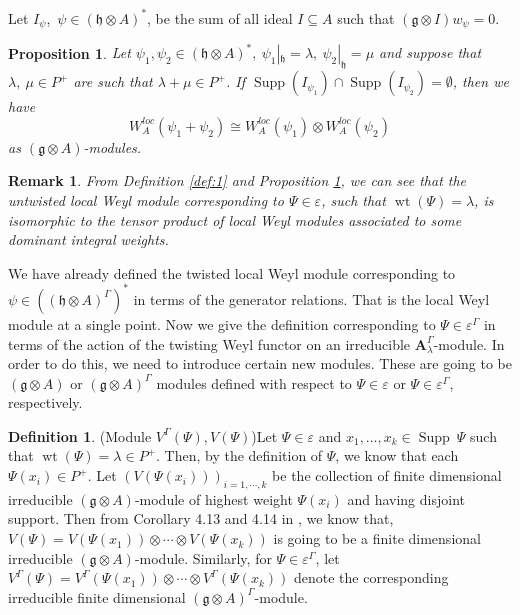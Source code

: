 \documentclass[11pt]{amsart}
\theoremstyle{plain}
\newtheorem{prop}[thm]{Proposition}
\newtheorem{rem}[thm]{Remark}
\theoremstyle{definition}
\newtheorem{defn}[thm]{Definition}
\newcommand{\g}{\mathfrak{g}}
\newcommand{\h}{\mathfrak{h}}
\newcommand{\A}{\mathbf{A}_{\lambda}^{\Gamma}}
\DeclareMathOperator{\Supp}{Supp}
\DeclareMathOperator{\wt}{wt}
\begin{document}
Let $I_{\psi}$,~$\psi\in(\h\otimes A)^{*}$, be the sum of all ideal $I\subseteq A$ such that $(\g\otimes I)w_{\psi}=0$. 
\begin{prop}\label{prop:5}
Let $\psi_{1}, \psi_{2}\in(\h\otimes A)^{*},~\psi_{1}|_{\h}=\lambda,~\psi_{2}|_{\h}=\mu$ and suppose that $\lambda,~\mu\in P^{+}$ are such that $\lambda+\mu\in P^{+}$. If $\Supp(I_{{\psi}_{1}})\cap \Supp(I_{{\psi_{2}}})=\emptyset$, then we have
    \begin{equation*}
        W_{A}^{loc}(\psi_{1}+\psi_{2})\cong W_{A}^{loc}(\psi_{1})\otimes W_{A}^{loc}(\psi_{2})
    \end{equation*}
    as $(\g\otimes A)$-modules.
\end{prop}
\begin{rem}\label{rem:2}
From Definition  \ref{def:1} and Proposition \ref{prop:5}, we can see that the untwisted local Weyl module corresponding to $\Psi\in\varepsilon$, such that $\wt(\Psi)=\lambda$, is isomorphic to the tensor product of local Weyl modules associated to some dominant integral weights.
\end{rem}
We have already defined the twisted local Weyl module corresponding to $\psi\in((\h\otimes A)^{\Gamma})^{*}$ in terms of the generator relations. That is the local Weyl module at a single point. Now we give the definition corresponding to $\Psi\in\varepsilon^{\Gamma}$ in terms of the action of the twisting Weyl functor on an irreducible $\A$-module. In order to do this, we need to introduce certain new modules. These are going to be $(\g\otimes A)$ or $(\g\otimes A)^{\Gamma}$ modules defined with respect to $\Psi\in\varepsilon$ or $\Psi\in\varepsilon^{\Gamma}$, respectively.
\begin{defn}(Module $V^{\Gamma}(\Psi),V(\Psi)$)\label{def:17}
    Let $\Psi\in\varepsilon$ and $x_{1},\ldots,x_{k}\in \Supp\ \Psi$ such that $\wt(\Psi)=\lambda\in P^{+}$. Then, by the definition of $\Psi$, we know that each $\Psi(x_{i})\in P^{+}$. Let ${ (V(\Psi(x_{i})))}_{i=1,\cdots,k}$ be the collection of finite dimensional irreducible $(\g\otimes A)$-module of highest weight $\Psi(x_{i})$ and having disjoint support. Then from Corollary 4.13 and 4.14 in \cite{Sav14}, we know that, $V(\Psi)=V(\Psi(x_{1}))\otimes\cdots\otimes V(\Psi(x_{k}))$ is going to be a finite dimensional irreducible $(\g\otimes A)$-module. Similarly, for $\Psi\in\varepsilon^{\Gamma}$, let $V^{\Gamma}(\Psi)=V^{\Gamma}(\Psi(x_{1}))\otimes\cdots\otimes V^{\Gamma}(\Psi(x_{k}))$ denote the corresponding irreducible finite dimensional $(\g\otimes A)^{\Gamma}$-module.
\end{defn}
\end{document}
